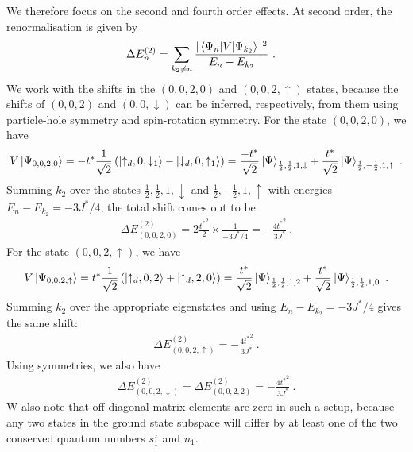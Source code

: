 We therefore focus on the second and fourth order effects. At second order, the renormalisation is given by
\begin{equation}\begin{aligned}
	\Delta E_n^{(2)} &= \sum_{k_2 \neq n} \frac{|\braket{\Psi_n | V | \Psi_{k_2}}|^2}{E_n - E_{k_2}}~.
\end{aligned}\end{equation}
We work with the shifts in the \((0,0,2,0)\) and \((0,0,2,\uparrow)\) states, because the shifts of \((0,0,2)\) and \((0,0,\downarrow)\) can be inferred, respectively, from them using particle-hole symmetry and spin-rotation symmetry. For the state \((0,0,2,0)\), we have
\begin{equation}\begin{aligned}
	V \ket{\Psi_{0,0,2,0}} = -t^* \frac{1}{\sqrt 2}\left(\ket{\uparrow_d,0,\downarrow_1} - \ket{\downarrow_d,0,\uparrow_1}\right) = \frac{-t^*}{\sqrt 2}\ket{\Psi}_{\frac{1}{2},\frac{1}{2},1,\downarrow} + \frac{t^*}{\sqrt 2}\ket{\Psi}_{\frac{1}{2},-\frac{1}{2},1,\uparrow}~.
\end{aligned}\end{equation}
Summing \(k_2\) over the states \(\frac{1}{2},\frac{1}{2},1,\downarrow\) and \(\frac{1}{2},-\frac{1}{2},1,\uparrow\) with energies \(E_n - E_{k_2} = -3J^*/4\), the total shift comes out to be
\begin{equation}\begin{aligned}
	\Delta E^{(2)}_{(0,0,2,0)} = 2 \frac{{t^*}^2}{2}\times \frac{1}{-3J^*/4} = -\frac{4{t^*}^2}{3J^*}~.
\end{aligned}\end{equation}
For the state \((0,0,2,\uparrow)\), we have
\begin{equation}\begin{aligned}
	V \ket{\Psi_{0,0,2,\uparrow}} = t^* \frac{1}{\sqrt 2}\left(\ket{\uparrow_d,0,2} + \ket{\uparrow_d,2,0}\right) = \frac{t^*}{\sqrt 2}\ket{\Psi}_{\frac{1}{2},\frac{1}{2},1,2} + \frac{t^*}{\sqrt 2}\ket{\Psi}_{\frac{1}{2},\frac{1}{2},1,0}~.
\end{aligned}\end{equation}
Summing \(k_2\) over the appropriate eigenstates and using \(E_n - E_{k_2} = -3J^*/4\) gives the same shift:
\begin{equation}\begin{aligned}
	\Delta E^{(2)}_{(0,0,2,\uparrow)} = -\frac{4{t^*}^2}{3J^*}~.
\end{aligned}\end{equation}
Using symmetries, we also have
\begin{equation}\begin{aligned}
	\Delta E^{(2)}_{(0,0,2,\downarrow)} = \Delta E^{(2)}_{(0,0,2,2)} = -\frac{4{t^*}^2}{3J^*}~.
\end{aligned}\end{equation}
W also note that off-diagonal matrix elements are zero in such a setup, because any two states in the ground state subspace will differ by at least one of the two conserved quantum numbers \(s_1^z\) and \(n_1\).


